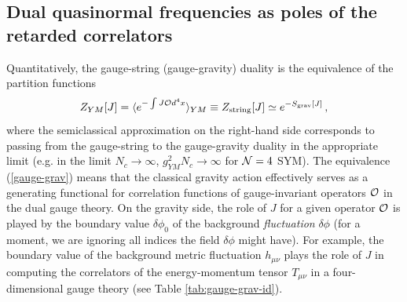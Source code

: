 \documentclass[]{iopart}
\begin{document}
\subsection{\label{dualqnms}Dual quasinormal frequencies as poles of the retarded correlators}
%
Quantitatively, the gauge-string (gauge-gravity) duality is the equivalence of
the partition functions
%
\begin{equation}\label{gauge-grav}
Z_{YM} [J] = \langle e^{- \int J {\cal O} d^4x}\rangle_{YM} 
\equiv Z_{\rm string}[J] \simeq e^{-S_{\rm grav}[J]}\,,
\end{equation}
%
where the semiclassical approximation on the right-hand side corresponds to
passing from the gauge-string to the gauge-gravity duality in the appropriate
limit (e.g.  in the limit $N_c\rightarrow \infty$, $g^2_{YM}N_c \rightarrow
\infty$ for ${\cal N}=4$ SYM).  The equivalence (\ref{gauge-grav}) means that
the classical gravity action effectively serves as a generating functional for
correlation functions of gauge-invariant operators ${\cal O}$ in the dual
gauge theory.  On the gravity side, the role of $J$ for a given operator
${\cal O}$ is played by the boundary value $\delta \phi_0$ of the background
{\it fluctuation} $\delta \phi$ (for a moment, we are ignoring all indices the
field $\delta \phi$ might have).  For example, the boundary value of the
background metric fluctuation $h_{\mu\nu}$ plays the role of $J$ in computing
the correlators of the energy-momentum tensor $T_{\mu\nu}$ in a
four-dimensional gauge theory (see Table \ref{tab:gauge-grav-id}).
\end{document}

